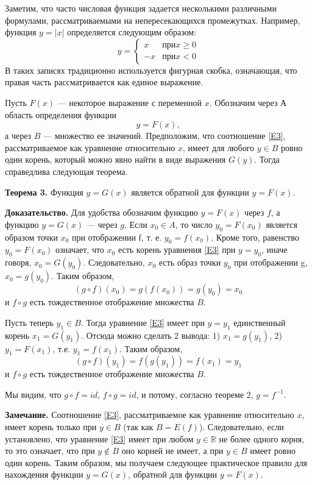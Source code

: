 \documentclass{article}
\begin{document}
\par Заметим, что часто числовая функция задается несколькими различными формулами, рассматриваемыми на непересекающихся промежутках. Например, функция $y=|x|$ определяется следующим образом:
$$y=
\begin{cases}
x&\text{при} x\ge 0\\
-x&\text{при} x<0
\end{cases}
$$
В таких записях традиционно используется фигурная скобка, означающая, что правая часть рассматривается как единое выражение.
\par Пусть $F(x)$ — некоторое выражение с переменной $x$. Обозначим через $А$ область определения функции
\begin{equation}\label{E3}
y=F(x),
\end{equation}
а через $B$ — множество ее значений. Предположим, что соотношение \eqref{E3}, рассматриваемое как уравнение относительно $x$, имеет для любого $y\in B$ ровно один корень, который можно явно найти в виде выражения $G(y)$. Тогда справедлива следующая теорема.
\par\textbf{Теорема 3.}  Функция $y=G(x)$ является обратной для функции $y=F(x)$.
\par \textbf{Доказательство.} Для удобства обозначим функцию $y=F(x)$ через $f$, а функцию $y=G(x)$ — через $g$. Если $x_0\in A$, то число $y_0=F(x_0)$ является образом точки $x_0$ при отображении f, т. е. $y_0=f(x_0).$ Кроме того, равенство $y_0=F(x_0)$ означает, что $x_0$ есть корень уравнения \eqref{E3} при $y=y_0$, иначе говоря, $x_0=G(y_0).$ Следовательно, $x_0$ есть образ точки $y_0$ при отображении g, $x_0=g(y_0).$ Таким образом,
$$(g\circ f)(x_0)=g(f(x_0))=g(y_0)=x_0$$
и $f\circ g$ есть тождественное отображение множества $B$.
\par Пусть теперь $y_1\in B$. Тогда уравнение \eqref{E3} имеет при $y=y_1$ единственный корень $x_1=G(y_1)$. Отсюда можно сделать 2 вывода: 1) $x_1=g(y_1)$, 2) $y_1=F(x_1)$, т.е. $y_1=f(x_1)$. Таким образом,
$$(g\circ f)(y_1)=f(g(y_1))=f(x_1)=y_1$$
и $f\circ g$ есть тождественное отображение множества $B$.
\par Мы видим, что $g\circ f=id$, $f\circ g=id$, и потому, согласно теореме 2, $g=f^{-1}$.
\par \textbf{Замечание.} Соотношение \eqref{E3}, рассматриваемое как уравнение относительно $x$, имеет корень только при $y\in B$ (так как $B = E(f)$). Следовательно, если установлено, что уравнение \eqref{E3} имеет при любом $y\in \mathbb{R}$ не более одного корня, то это означает, что при $y\notin B$ оно корней не имеет, а при $y\in B$ имеет ровно один корень. Таким образом, мы получаем следующее практическое правило для нахождения функции $y=G(x)$, обратной для функции $y=F(x).$
\end{document}
